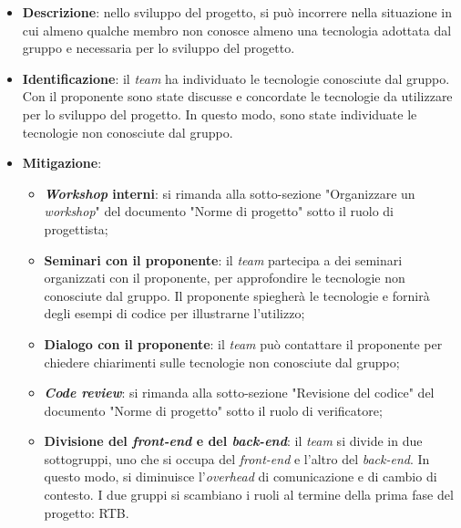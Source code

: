 \label{risk:conoscenza tecnologie carente}
\begin{itemize}
	\item \textbf{Descrizione}:
	      nello sviluppo del progetto, si può incorrere nella situazione in cui
	      almeno qualche membro non conosce almeno una tecnologia adottata dal
	      gruppo e necessaria per lo sviluppo del progetto.

	\item \textbf{Identificazione}: il \textit{team} ha individuato le
	      tecnologie conosciute dal gruppo. Con il proponente sono state
	      discusse e concordate le tecnologie da utilizzare per lo sviluppo del
	      progetto. In questo modo, sono state individuate le tecnologie
	      non conosciute dal gruppo.

	\item \textbf{Mitigazione}:
	      \begin{itemize}
		      \item \textbf{\textit{Workshop} interni}: si rimanda alla
		            sotto-sezione "Organizzare un \textit{workshop}" del
		            documento "Norme di progetto" sotto il ruolo di progettista;

		      \item \textbf{Seminari con il proponente}: il \textit{team}
		            partecipa a
		            dei seminari organizzati con il proponente, per approfondire
		            le tecnologie non conosciute dal gruppo. Il proponente
		            spiegherà le tecnologie e fornirà degli esempi di codice
		            per illustrarne l'utilizzo;

		      \item \textbf{Dialogo con il proponente}: il \textit{team} può
		            contattare il proponente per chiedere chiarimenti sulle
		            tecnologie non conosciute dal gruppo;

		      \item \textbf{\textit{Code review}}: si rimanda alla sotto-sezione
		            "Revisione del codice" del documento "Norme di progetto"
		            sotto il ruolo di verificatore;

		      \item \textbf{Divisione del \textit{front-end} e del
			            \textit{back-end}}: il \textit{team} si divide in due
		            sottogruppi, uno che si occupa del \textit{front-end} e
		            l'altro del \textit{back-end}. In questo modo, si diminuisce
		            l'\textit{overhead} di comunicazione e di cambio di
		            contesto. I due gruppi si scambiano i ruoli al
		            termine della prima fase del progetto: RTB.
	      \end{itemize}
\end{itemize}
